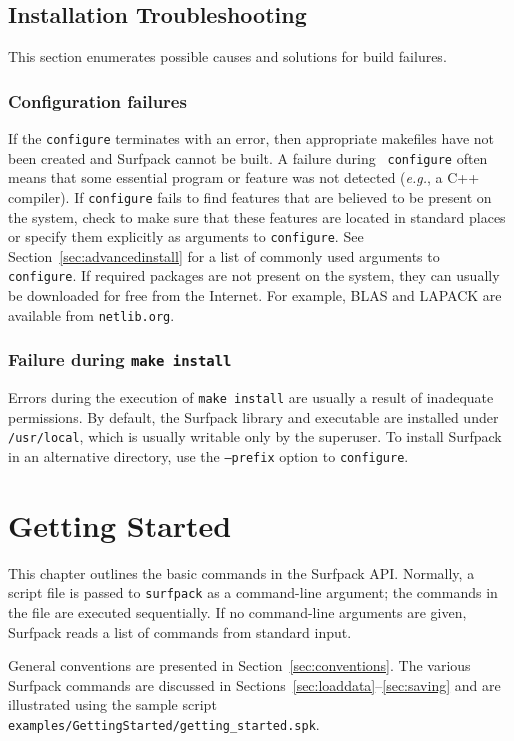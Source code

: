 \documentclass{article}
\begin{document}
\subsection{Installation Troubleshooting}\label{sec:installtrouble}
This section enumerates possible causes and solutions for build failures.
\subsubsection{Configuration failures}
If the \texttt{configure} terminates with an error, then appropriate makefiles
have not been created and Surfpack cannot be built.  A failure during \texttt{ 
configure} often means that some essential program or feature was not
detected ({\em e.g.}, a C++ compiler). If \texttt{configure} fails to find features that are
believed to be present on the system, check to make sure that these features are
located in standard places or specify them explicitly as arguments to \texttt{configure}.
See Section~\ref{sec:advancedinstall} for a list of commonly used arguments to \texttt{configure}.  If required
packages are not present on the system, they can usually be downloaded for free
from the Internet.  For example, BLAS and LAPACK are available from \texttt{netlib.org}.
\subsubsection{Failure during \texttt{make install}}
Errors during the execution of \texttt{make install} are usually a result of inadequate permissions. By default, the
Surfpack library and executable are installed under \texttt{/usr/local}, which is usually
writable only by the superuser.  To install Surfpack in an alternative
directory, use the \texttt{--prefix} option to \texttt{configure}. 

\section{Getting Started}
This chapter outlines the basic commands in the Surfpack API.  Normally, a script file
is passed to \texttt{surfpack} as a command-line argument; the commands in
the file are executed sequentially.  If no command-line arguments are given,
Surfpack reads a list of commands from standard input.

General conventions are presented in Section~\ref{sec:conventions}.  The various Surfpack commands
are discussed in Sections~\ref{sec:loaddata}--\ref{sec:saving} and are illustrated using the sample script \texttt{examples/GettingStarted/getting\_started.spk}.  
\end{document}

